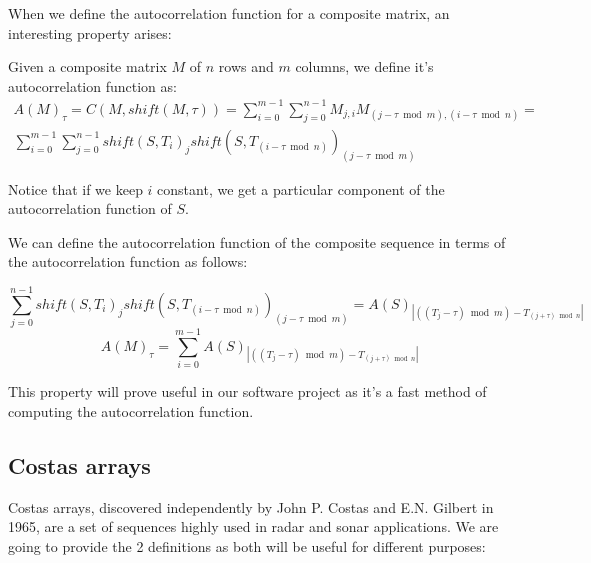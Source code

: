 When we define the autocorrelation function for a composite matrix, an
interesting property arises:

\begin{definition}
  Given a composite matrix $M$ of $n$ rows and $m$ columns, we define it's
  autocorrelation function as:
  \begin{equation}
    \begin{split}
      A(M)_{\tau} = C(M, shift(M, \tau)) = \sum_{i=0}^{m-1}\sum_{j=0}^{n-1}M_{j, i}M_{(j-\tau \bmod m),(i - \tau \bmod n)} = \\
      \sum_{i=0}^{m-1}\sum_{j=0}^{n-1}shift(S, T_{i})_{j}shift(S, T_{(i - \tau \bmod n)})_{(j-\tau \bmod m)}
    \end{split}
  \end{equation}
\end{definition}

Notice that if we keep $i$ constant, we get a particular component of the
autocorrelation function of $S$.

\begin{property} \label{composition:prop:1}
We can define the autocorrelation function of the composite
sequence in terms of the autocorrelation function as follows:

\begin{equation}
  \sum_{j=0}^{n-1}shift(S, T_{i})_{j}shift(S, T_{(i - \tau \bmod n)})_{(j-\tau \bmod m)} = A(S)_{|((T_{j} - \tau) \bmod m) - T_{(j + \tau) \bmod n}|}
\end{equation}
\begin{equation}
  A(M)_{\tau} = \sum_{i=0}^{m-1} A(S)_{|((T_{j} - \tau) \bmod m) - T_{(j + \tau) \bmod n}|}
\end{equation}

\end{property}

This property will prove useful in our software project as it's a fast method
of computing the autocorrelation function.

\subsection{Costas arrays}

Costas arrays, discovered independently by John P. Costas\cite{costas_costas}
and E.N. Gilbert \cite{gilbert_costas} in 1965, are a set of sequences highly
used in radar and sonar applications. We are going to provide the 2 definitions
as both will be useful for different purposes:


